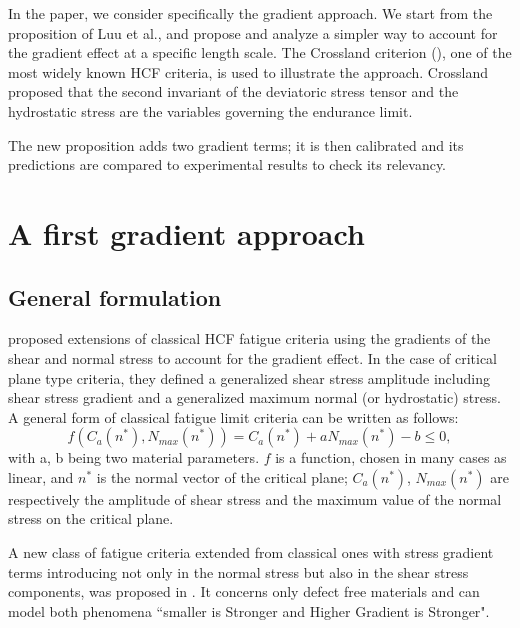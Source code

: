 In the paper, we consider specifically the gradient approach. We start from the proposition of Luu et al., and propose and analyze a simpler way to account for the gradient effect at a specific length scale. The Crossland criterion (\cite{crossland1956effect}), one of the most widely known HCF criteria, is used to illustrate the approach. Crossland proposed that the second invariant of the deviatoric stress tensor and the hydrostatic stress are the variables governing the endurance limit. 

The new proposition adds two gradient terms; it is then calibrated and its predictions are compared to experimental results to check its relevancy.


\section{A first gradient approach}
\subsection{General formulation}

\cite{luu2014formulation} proposed extensions of classical HCF fatigue criteria using the gradients of the shear and normal stress to account for the gradient effect. In the case of critical plane type criteria, they defined a generalized shear stress amplitude including shear stress gradient and a generalized maximum normal (or hydrostatic) stress.
A general form of classical fatigue limit criteria can be written as follows:
\begin{equation}
	\label{eq:classical}
	f(C_a(n^*),N_{max}(n^*))=C_a(n^*)+aN_{max}(n^*)-b\leqslant 0 ,
\end{equation}
with a, b being two material parameters. $f$ is a function, chosen in many cases as linear, and $n^*$ is the normal vector of the critical plane; $C_a(n^* )$, $N_{max} (n^* )$ are respectively the amplitude of shear stress and the maximum value of the normal stress on the critical plane.

A new class of fatigue criteria extended from classical ones with stress gradient terms introducing not only in the normal stress but also in the shear stress components, was proposed in \cite{luu2014formulation}. It concerns only defect free materials and can model both phenomena ``smaller is Stronger and Higher Gradient is Stronger". 

